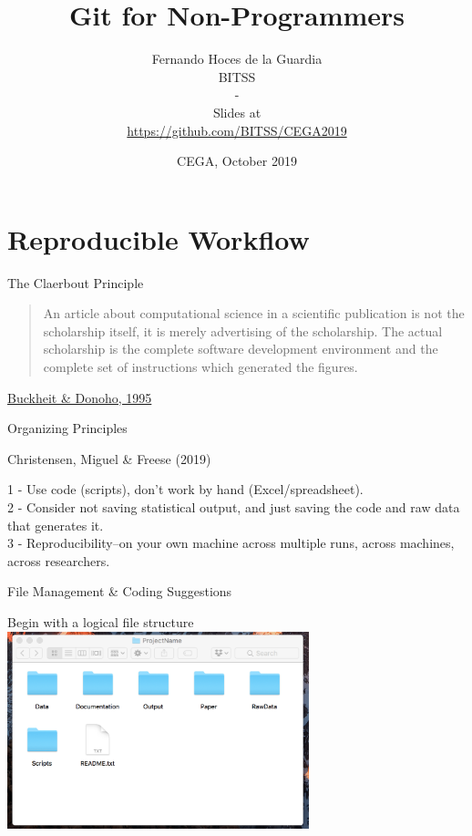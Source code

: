 \documentclass[ignorenonframetext,]{beamer}
\title{Git for Non-Programmers}
\author{Fernando Hoces de la Guardia\\
BITSS\\
-\\
Slides at\\
\hspace*{0.333em}\url{https://github.com/BITSS/CEGA2019}}
\date{CEGA, October 2019}
\begin{document}
\frame{\titlepage}

\begin{frame}
\tableofcontents[hideallsubsections]
\end{frame}
\hypertarget{reproducible-workflow}{%
\section{Reproducible Workflow}\label{reproducible-workflow}}

\begin{frame}{The Claerbout Principle}
\protect\hypertarget{the-claerbout-principle}{}

\begin{quote}
An article about computational science in a scientific publication is
not the scholarship itself, it is merely advertising of the scholarship.
The actual scholarship is the complete software development environment
and the complete set of instructions which generated the figures.
\end{quote}

\href{https://statweb.stanford.edu/~wavelab/Wavelab_850/wavelab.pdf}{Buckheit
\& Donoho, 1995}

\end{frame}

\begin{frame}{Organizing Principles}
\protect\hypertarget{organizing-principles}{}

Christensen, Miguel \& Freese (2019)

1 - Use code (scripts), don't work by hand (Excel/spreadsheet).\\
2 - Consider not saving statistical output, and just saving the code and
raw data that generates it.\\
3 - Reproducibility--on your own machine across multiple runs, across
machines, across researchers.

\end{frame}

\begin{frame}{File Management \& Coding Suggestions}
\protect\hypertarget{file-management-coding-suggestions}{}

Begin with a logical file structure
\includegraphics[height=2.25in]{../Images/files.png}

\end{frame}
\end{document}
